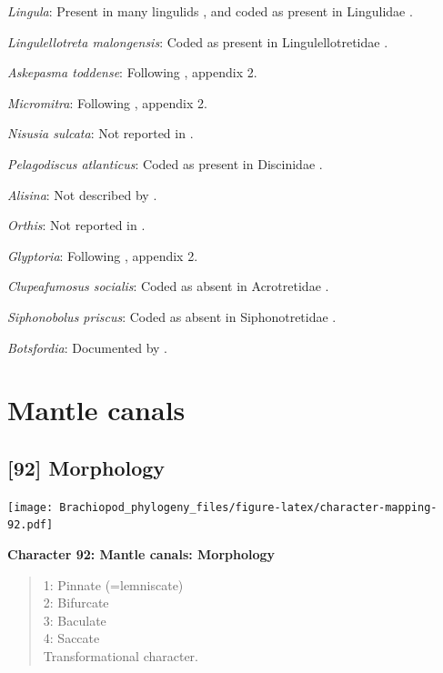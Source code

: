 \documentclass[]{book}
\theoremstyle{definition}
\theoremstyle{definition}
\theoremstyle{definition}
\theoremstyle{remark}
\begin{document}
\emph{Lingula}: Present in many lingulids
\citep{Williams2000BrachiopodaLinguliformea}, and coded as present in
Lingulidae \citep[table 6]{Williams2000BrachiopodaLinguliformea}.

\emph{Lingulellotreta malongensis}: Coded as present in
Lingulellotretidae \citep[table
6]{Williams2000BrachiopodaLinguliformea}.

\emph{Askepasma toddense}: Following \citet{Williams1998Thediversity},
appendix 2.

\emph{Micromitra}: Following \citet{Williams1998Thediversity}, appendix
2.

\emph{Nisusia sulcata}: Not reported in
\citet{Williams2000BrachiopodaLinguliformea}.

\emph{Pelagodiscus atlanticus}: Coded as present in Discinidae
\citep[table 6]{Williams2000BrachiopodaLinguliformea}.

\emph{Alisina}: Not described by
\citet{Williams2000BrachiopodaLinguliformea}.

\emph{Orthis}: Not reported in
\citet{Williams2000BrachiopodaLinguliformea}.

\emph{Glyptoria}: Following \citet{Williams1998Thediversity}, appendix
2.

\emph{Clupeafumosus socialis}: Coded as absent in Acrotretidae
\citep[table 6]{Williams2000BrachiopodaLinguliformea}.

\emph{Siphonobolus priscus}: Coded as absent in Siphonotretidae
\citep[table 6]{Williams2000BrachiopodaLinguliformea}.

\emph{Botsfordia}: Documented by \citet{Skovsted2017Depthrelated}.

\hypertarget{mantle-canals}{%
\section{Mantle canals}\label{mantle-canals}}

\hypertarget{morphology-1}{%
\subsection*{{[}92{]} Morphology}\label{morphology-1}}

\texttt{[image: Brachiopod\_phylogeny\_files/figure-latex/character-mapping-92.pdf]}

\textbf{Character 92: Mantle canals: Morphology}

\begin{quote}
1: Pinnate (=lemniscate)\\
2: Bifurcate\\
3: Baculate\\
4: Saccate\\
Transformational character.
\end{quote}
\end{document}
